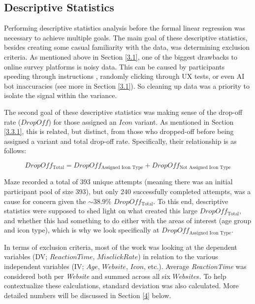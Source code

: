 \documentclass[12pt,twoside]{reedthesis}
\begin{document}
    \subsection{Descriptive Statistics} \label{3.3.3}
        Performing descriptive statistics analysis before the formal linear regression was necessary to achieve multiple goals. The main goal of these descriptive statistics, besides creating some casual familiarity with the data, was determining exclusion criteria. As mentioned above in Section \ref{3.1}, one of the biggest drawbacks to online survey platforms is noisy data. This can be caused by participants speeding through instructions \cite{palan_prolificacsubject_2018}, randomly clicking through UX tests, or even AI bot inaccuracies \cite{peterson_impact_nodate, asher_chatbots_2025, christoforou_generative_2024} (see more in Section \ref{3.1}). So cleaning up data was a priority to isolate the signal within the variance.

        The second goal of these descriptive statistics was making sense of the drop-off rate ($DropOff$) for those assigned an $Icon$ variant. As mentioned in Section \ref{3.3.1}, this is related, but distinct, from those who dropped-off before being assigned a variant and total drop-off rate. Specifically, their relationship is as follows:

        $$DropOff_{\text{Total}} = DropOff_{\text{Assigned Icon Type}} + DropOff_{\text{Not Assigned Icon Type}} $$
        
        Maze recorded a total of 393 unique attempts (meaning there was an initial participant pool of size 393), but only 240 successfully completed attempts, was a cause for concern given the $\sim38.9\%$ $DropOff_{\text{Total}}$. To this end, descriptive statistics were supposed to shed light on what created this large $DropOff_{\text{Total}}$, and whether this had something to do either with the areas of interest (age group and icon type), which is why we look specifically at $DropOff_{\text{Assigned Icon Type}}$.

        In terms of exclusion criteria, most of the work was looking at the dependent variables (DV; $ReactionTime$, $MisclickRate$) in relation to the various independent variables (IV; $Age$, $Website$, $Icon$, etc.). Average \textit{ReactionTime} was considered both per \textit{Website} and summed across all six $Website$s. To help contextualize these calculations, standard deviation was also calculated. More detailed numbers will be discussed in Section \ref{4} below. 
\end{document}
